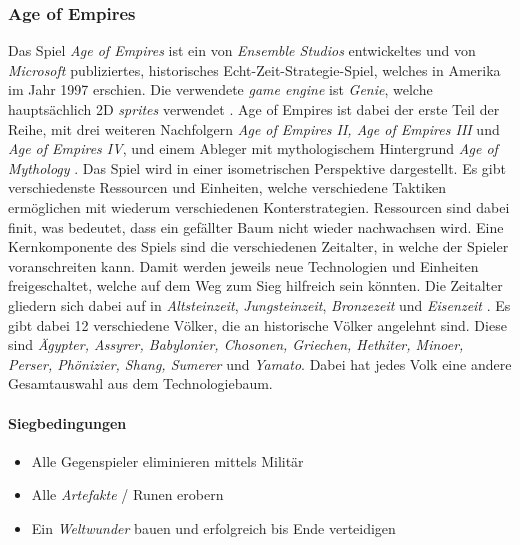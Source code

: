 \subsubsection{Age of Empires}
Das Spiel \textit{Age of Empires} ist ein von \textit{Ensemble Studios} entwickeltes und von \textit{Microsoft} publiziertes, historisches Echt-Zeit-Strategie-Spiel, welches in Amerika im Jahr 1997 erschien. Die verwendete \textit{game engine} ist \textit{Genie}, welche hauptsächlich 2D \textit{sprites} verwendet \cite{aoe}. Age of Empires ist dabei der erste Teil der Reihe, mit drei weiteren Nachfolgern \textit{Age of Empires II, Age of Empires III} und \textit{Age of Empires IV}, und einem Ableger mit mythologischem Hintergrund \textit{Age of Mythology} \cite{aoe2}. Das Spiel wird in einer isometrischen Perspektive dargestellt. Es gibt verschiedenste Ressourcen und Einheiten, welche verschiedene Taktiken ermöglichen mit wiederum verschiedenen Konterstrategien. Ressourcen sind dabei finit, was bedeutet, dass ein gefällter Baum nicht wieder nachwachsen wird. Eine Kernkomponente des Spiels sind die verschiedenen Zeitalter, in welche der Spieler voranschreiten kann. Damit werden jeweils neue Technologien und Einheiten freigeschaltet, welche auf dem Weg zum Sieg hilfreich sein könnten. Die Zeitalter gliedern sich dabei auf in \textit{Altsteinzeit}, \textit{Jungsteinzeit}, \textit{Bronzezeit} und \textit{Eisenzeit} \cite*[]{aoe}. Es gibt dabei 12 verschiedene Völker, die an historische Völker angelehnt sind. Diese sind \textit{Ägypter, Assyrer, Babylonier, Chosonen, Griechen, Hethiter, Minoer, Perser, Phönizier, Shang, Sumerer} und \textit{Yamato}. Dabei hat jedes Volk eine andere Gesamtauswahl aus dem Technologiebaum. 
\paragraph*{Siegbedingungen}
\begin{itemize}
    \item Alle Gegenspieler eliminieren mittels Militär
    \item Alle \textit{Artefakte} / Runen erobern
    \item Ein \textit{Weltwunder} bauen und erfolgreich bis Ende verteidigen
\end{itemize}

